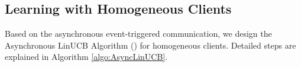 


\subsection{Learning with Homogeneous Clients}
\label{subsec:async_LinUCB}
Based on the asynchronous event-triggered communication, we design the Asynchronous LinUCB Algorithm (\modelone{}) for homogeneous clients. Detailed steps are explained in Algorithm \ref{algo:AsyncLinUCB}.

